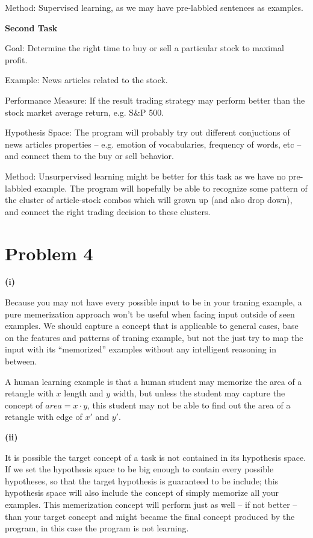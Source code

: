 \documentclass[12pt]{article}
\begin{document}
Method: Supervised learning, as we may have pre-labbled sentences as examples.\newline

\noindent\textbf{Second Task}

Goal: Determine the right time to buy or sell a particular stock to maximal profit.

Example: News articles related to the stock.

Performance Measure: If the result trading strategy may perform better than the stock market average return, e.g. S&P 500.

Hypothesis Space: The program will probably try out different conjuctions of news articles properties -- e.g. emotion of vocabularies, frequency of words, etc -- and connect them to the buy or sell behavior.

Method: Unsurpervised learning might be better for this task as we have no pre-labbled example. The program will hopefully be able to recognize some pattern of the cluster of article-stock combos which will grown up (and also drop down), and connect the right trading decision to these clusters.

\section{Problem 4}

\textbf{(i)}

Because you may not have every possible input to be in your traning example, a pure memerization approach won't be useful when facing input outside of seen examples. We should capture a concept that is applicable to general cases, base on the features and patterns of traning example, but not the just try to map the input with its ``memorized'' examples without any intelligent reasoning in between.

A human learning example is that a human student may memorize the area of a retangle with $x$ length and $y$ width, but unless the student may capture the concept of $area = x \cdot y$, this student may not be able to find out the area of a retangle with edge of $x'$ and $y'$.\newline

\noindent\textbf{(ii)}

It is possible the target concept of a task is not contained  in its hypothesis space. If we set the hypothesis space to be big enough to contain every possible hypotheses, so that the target hypothesis is guaranteed to be include; this hypothesis space will also include the concept of simply memorize all your examples. This memerization concept will perform just as well -- if not better -- than your target concept and might became the final concept produced by the program, in this case the program is not learning.
\end{document}
